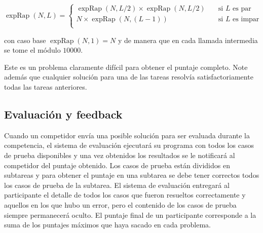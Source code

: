 \begin{description}
\[   
\operatorname{expRap}(N,L) = 
     \begin{cases}
       \operatorname{expRap}(N,{L}/{2}) \times 
\operatorname{expRap}(N,{L}/{2}) &\quad\text{si $L$ es par}\\
       N\times \operatorname{expRap}(N,{(L-1)}) &\quad\text{si $L$ es impar}\\
     \end{cases}
\]


con caso base $\operatorname{expRap}(N,1)=N$ y de manera que en cada llamada intermedia 
se tome el módulo $10000$.

\end{description}
Este es un problema claramente difícil para obtener el puntaje completo.
Note además que cualquier solución para una de las tareas resolvía satisfactoriamente todas
las tareas anteriores.

\subsection{Evaluación y feedback}

Cuando un competidor envía una posible solución para ser evaluada durante la competencia,
el sistema de evaluación ejecutará su programa con todos los casos de prueba disponibles 
y una vez obtenidos los resultados se le notificará al competidor del puntaje obtenido.
Los casos de prueba están divididos en subtareas y para obtener el puntaje en
una subtarea se debe tener correctos todos los casos de prueba de la subtarea.
El sistema de evaluación entregará al participante el detalle de todos los casos
que fueron resueltos correctamente y aquellos en los que hubo un error, pero el
contenido de los casos de prueba siempre permanecerá oculto.
El puntaje final de un participante corresponde a la suma de los puntajes máximos que haya sacado en cada problema.

